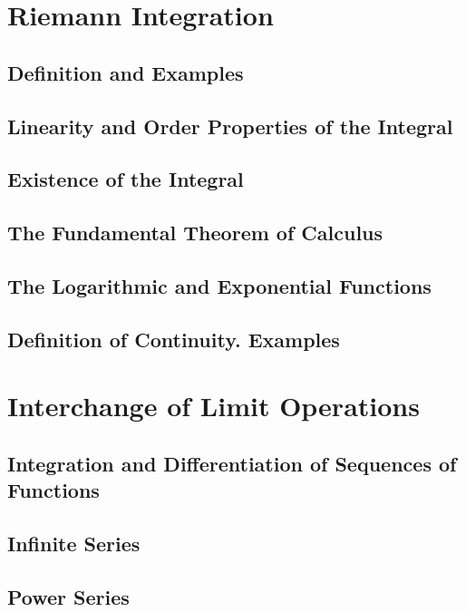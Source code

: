 \documentclass{article}
\begin{document}
	\section{Riemann Integration}
		\subsection{Definition and Examples}
		
		\subsection{Linearity and Order Properties of the Integral}
		
		\subsection{Existence of the Integral}
		
		\subsection{The Fundamental Theorem of Calculus}
		
		\subsection{The Logarithmic and Exponential Functions}
		
		\subsection{Definition of Continuity. Examples}
	
	
	\section{Interchange of Limit Operations}
		\subsection{Integration and Differentiation of Sequences of Functions}
		
		\subsection{Infinite Series}
		
		\subsection{Power Series}
		
\end{document}
